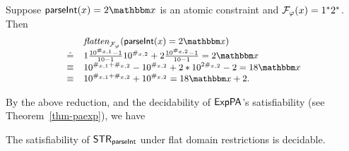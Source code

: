 \begin{example}
Suppose $\parseInt(\svarx) = 2\ivarx$ is an atomic constraint and $\mathcal{F}_\varphi(x) = 1^*2^*$. Then 
\[
\small
\begin{array}{l l}
& \flatten_{\flatfun_\varphi}(\parseInt(\svarx)  =  2\ivarx)  \\
\Def & 1 \frac{10^{\#_{\svarx,1}}-1}{10-1}10^{\#_{\svarx,2}}  + 2 \frac{10^{\#_{\svarx,2}}-1}{10-1} = 2\ivarx   \\
\equiv & 10^{\#_{\svarx,1}+\#_{\svarx,2}} - 10^{\#_{\svarx,2}}  + 2*10^{2\#_{\svarx,2}}- 2 = 18\ivarx \\
\equiv & 10^{\#_{\svarx,1}+\#_{\svarx,2}} +  10^{\#_{\svarx,2}} = 18\ivarx + 2.
\end{array}
\]
\end{example}

By the above reduction, and the decidability of ${\sf ExpPA}$'s satisfiability (see Theorem~\ref{thm-paexp}), we have 
\begin{theorem} \label{thm:string-parInt}
	The satisfiability of  ${\sf STR}_{\textsf{parseInt}}$ under flat domain restrictions  is decidable. 
\end{theorem}

